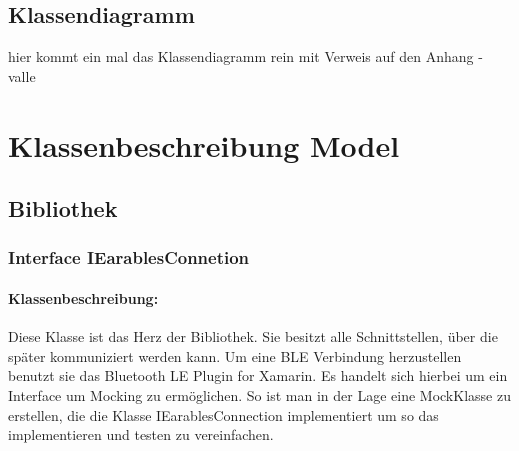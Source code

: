 \documentclass[a4paper,12pt]{article}
\begin{document}
  \subsection{Klassendiagramm}
hier kommt ein mal das Klassendiagramm rein mit Verweis auf den Anhang - valle
\clearpage
\section{Klassenbeschreibung Model}
\subsection{Bibliothek}
\subsubsection{ Interface IEarablesConnetion}

\paragraph{Klassenbeschreibung:}
Diese Klasse ist das Herz der Bibliothek. Sie besitzt alle Schnittstellen, über die später kommuniziert werden kann. Um eine BLE Verbindung herzustellen benutzt sie das \glqq Bluetooth LE Plugin for Xamarin\grqq{}. Es handelt sich hierbei um ein Interface um Mocking zu ermöglichen. So ist man in der Lage eine MockKlasse zu erstellen, die die Klasse IEarablesConnection implementiert um so das implementieren und testen zu vereinfachen.
\end{document}
